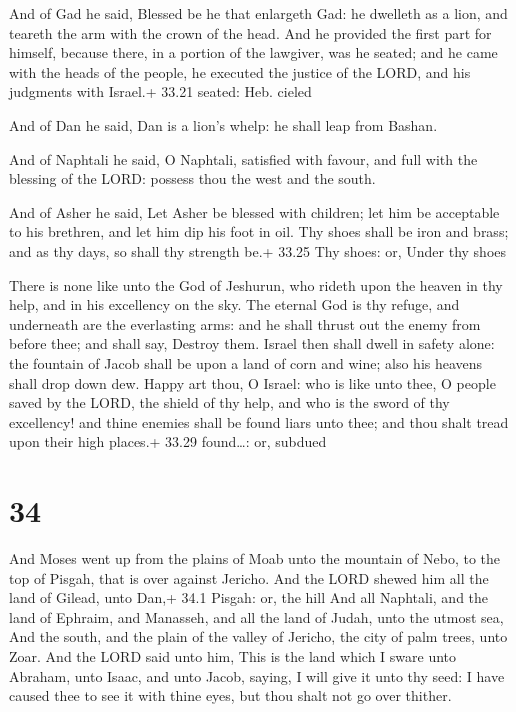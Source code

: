  And of Gad he said, Blessed be he that enlargeth Gad: he
dwelleth as a lion, and teareth the arm with the crown of the head.
 And he provided the first part for himself, because there,
in a portion of the lawgiver, was he seated; and he came with the heads
of the people, he executed the justice of the LORD, and his judgments
with Israel.+ 33.21 seated: Heb. cieled

 And of Dan he said, Dan is a lion's whelp: he shall leap
from Bashan.

 And of Naphtali he said, O Naphtali, satisfied with
favour, and full with the blessing of the LORD: possess thou the west
and the south.

 And of Asher he said, Let Asher be blessed with
children; let him be acceptable to his brethren, and let him dip his
foot in oil.  Thy shoes shall be iron and brass; and as thy
days, so shall thy strength be.+ 33.25 Thy shoes: or, Under thy shoes

 There is none like unto the God of Jeshurun, who rideth
upon the heaven in thy help, and in his excellency on the sky.
 The eternal God is thy refuge, and underneath are the
everlasting arms: and he shall thrust out the enemy from before thee;
and shall say, Destroy them.  Israel then shall dwell in
safety alone: the fountain of Jacob shall be upon a land of corn and
wine; also his heavens shall drop down dew.  Happy art
thou, O Israel: who is like unto thee, O people saved by the LORD, the
shield of thy help, and who is the sword of thy excellency! and thine
enemies shall be found liars unto thee; and thou shalt tread upon their
high places.+ 33.29 found\ldots: or, subdued

\hypertarget{section-33}{%
\section{34}\label{section-33}}

 And Moses went up from the plains of Moab unto the mountain
of Nebo, to the top of Pisgah, that is over against Jericho. And the
LORD shewed him all the land of Gilead, unto Dan,+ 34.1 Pisgah: or, the
hill  And all Naphtali, and the land of Ephraim, and
Manasseh, and all the land of Judah, unto the utmost sea, 
And the south, and the plain of the valley of Jericho, the city of palm
trees, unto Zoar.  And the LORD said unto him, This is the
land which I sware unto Abraham, unto Isaac, and unto Jacob, saying, I
will give it unto thy seed: I have caused thee to see it with thine
eyes, but thou shalt not go over thither.

